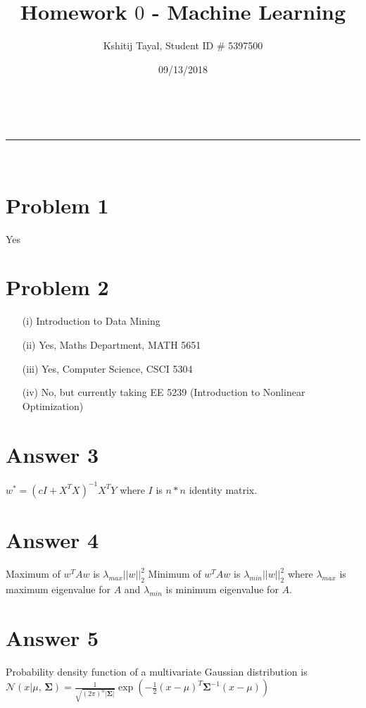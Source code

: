 \documentclass[a4paper,11pt]{article}
\makeatletter
\newcommand{\linia}{\rule{\linewidth}{0.5pt}}
\theoremstyle{mytheor}
\renewcommand{\maketitle}{
\begin{center}
\vspace{2ex}
{\huge \textsc{\@title}}
\vspace{1ex}
\\
\linia\\
\@author \hfill \@date
\vspace{4ex}
\end{center}
}
\makeatother
\begin{document}
\title{Homework $0$ - Machine Learning}

\author{Kshitij Tayal, Student ID \# 5397500}

\date{09/13/2018}

\maketitle

\section{Problem 1} Yes

\section{Problem 2}

\begin{enumerate}
    \item[(i)]  Introduction to Data Mining
    \item[(ii)]  Yes, Maths Department, MATH 5651
    \item[(iii)] Yes, Computer Science, CSCI 5304
    \item[(iv)] No, but currently taking EE 5239 (Introduction to Nonlinear Optimization)
\end{enumerate}

\section{Answer 3}
$w^{*} = (cI + X^{T}X)^{-1}X^{T}Y$
where $I$ is $n * n$ identity matrix.

\section{Answer 4}
Maximum of $w^{T}Aw$ is $\lambda_{max}||w||_{2}^{2}$ \newline
Minimum of $w^{T}Aw$ is $\lambda_{min}||w||_{2}^{2}$ \newline
where $\lambda_{max}$ is maximum eigenvalue for $A$ and $\lambda_{min}$ is minimum eigenvalue for $A$. 

\section{Answer 5}
Probability density function of a multivariate Gaussian distribution is \newline\newline
$\mathcal{N}(x|\mu,\,\boldsymbol\Sigma) = \frac{1}{\sqrt{(2\pi)^n|\boldsymbol\Sigma|}}
\exp\left(-\frac{1}{2}({x}-{\mu})^T{\boldsymbol\Sigma}^{-1}({x}-{\mu})
\right)$
\end{document}
